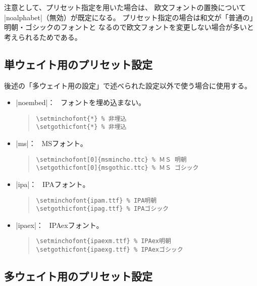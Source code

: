 \documentclass[uplatex,dvipdfmx,a4paper]{jsarticle}
\newcommand{\Means}{：\ }
\begin{document}
注意として、プリセット指定を用いた場合は、
欧文フォントの置換について |noalphabet|（無効）が既定になる。
プリセット指定の場合は和文が「普通の」明朝・ゴシックのフォントと
なるので欧文フォントを変更しない場合が多いと考えられるためである。

\subsection{単ウェイト用のプリセット設定}

後述の「多ウェイト用の設定」で述べられた設定以外で使う場合に使用する。

\begin{itemize}
\item |noembed|\Means
  フォントを埋め込まない。
\begin{quote}\small\begin{verbatim}
\setminchofont{*} % 非埋込
\setgothicfont{*} % 非埋込
\end{verbatim}\end{quote}

\item |ms|\Means
  MSフォント。
\begin{quote}\small\begin{verbatim}
\setminchofont[0]{msmincho.ttc} % ＭＳ 明朝
\setgothicfont[0]{msgothic.ttc} % ＭＳ ゴシック
\end{verbatim}\end{quote}

\item |ipa|\Means
  IPAフォント。
\begin{quote}\small\begin{verbatim}
\setminchofont{ipam.ttf} % IPA明朝
\setgothicfont{ipag.ttf} % IPAゴシック
\end{verbatim}\end{quote}

\item |ipaex|\Means
  IPAexフォント。
\begin{quote}\small\begin{verbatim}
\setminchofont{ipaexm.ttf} % IPAex明朝
\setgothicfont{ipaexg.ttf} % IPAexゴシック
\end{verbatim}\end{quote}
\end{itemize}

\subsection{多ウェイト用のプリセット設定}
\end{document}
